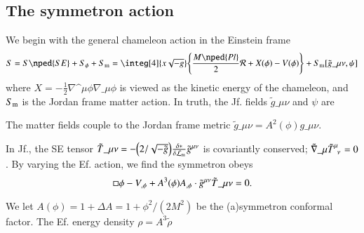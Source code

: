 
\subsection{The symmetron action}
% 



We begin with the general chameleon action in the Einstein frame
\begin{equation}
    S =S\nped{SE} + S_\phi  + S\ped{m}= \integ[4]{x\sqrt{-g}} \cclosed{ \frac{M\nped{Pl}}{2} \mathcal{R} + X(\phi) - V(\phi)} + S\ped{m}[\tilde{g}\_{\mu\nu} , \psi]
\end{equation} 
where $X= -\frac{1}{2} \nabla\^\mu \phi \nabla\_\mu \phi $ is viewed as the kinetic energy of the chameleon, and $S_\mathrm{m}$ is the Jordan frame matter action. In truth, the Jf. fields $\tilde{g}\_{\mu\nu}$ and $\psi$ are%


The matter fields couple to the Jordan frame metric $\tilde{g}\_{\mu\nu} = A^2(\phi)g\_{\mu\nu}$. 

In Jf., the SE tensor $\tilde{T}\_{\mu\nu} = -\pclosed{2/\sqrt{-\tilde{g}}} \Fdv*{\mathcal{L}\ped{m}}{\tilde{g}\^{\mu\nu}}$ is covariantly conserved; $\tilde{\nabla}\_{\mu}\tilde{T}\indices{^{\mu}_{\nu}}=0$. By varying the Ef. action, we find the symmetron obeys
\begin{equation}
    \sq \phi -V_{,\phi} + A^3(\phi) A_{,\phi} \cdot\tilde{g}\^{\mu\nu} \tilde{T}\_{\mu\nu}=0 .
\end{equation}



We let $A(\phi)=1+\Delta A= 1 + \phi^2/(2M^2)$ be the (a)symmetron conformal factor. The Ef. energy density $\rho=A^3\tilde{\rho}$

